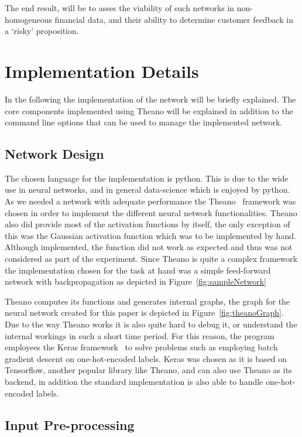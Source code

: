 \documentclass[12pt]{article}
\begin{document}
The end result, will be to asses the viability of such networks in non-homogeneous financial data, and their ability to determine customer feedback in a `risky' proposition.

\section{Implementation Details}
\label{sec:implementation_details}

In the following the implementation of the network will be briefly explained. The core components implemented using Theano will be explained in addition to the command line options that can be used to manage the implemented network.

\subsection{Network Design}
\label{sub:network_design}

The chosen language for the implementation is python. This is due to the wide use in neural networks, and in general data-science which is enjoyed by python. As we needed a network with adequate performance the Theano~\cite{theanoTutorial} framework was chosen in order to implement the different neural network functionalities. Theano also did provide most of the activation functions by itself, the only exception of this was the Gaussian activation function which was to be implemented by hand. Although implemented, the function did not work as expected and thus was not considered as part of the experiment. Since Theano is quite a complex framework the implementation chosen for the task at hand was a simple feed-forward network with backpropagation as depicted in Figure~\ref{fig:sampleNetwork}

Theano computes its functions and generates internal graphs, the graph for the neural network created for this paper is depicted in Figure~\ref{fig:theanoGraph}. Due to the way Theano works it is also quite hard to debug it, or understand the internal workings in such a short time period. For this reason, the program employees the Keras framework~\cite{keras} to solve problems such as employing batch gradient descent on one-hot-encoded labels. Keras was chosen as it is based on Tensorflow, another popular library like Theano, and can also use Theano as its backend, in addition the standard implementation is also able to handle one-hot-encoded labels.
\subsection{Input Pre-processing}
\label{sub:splitfunc}
\end{document}
